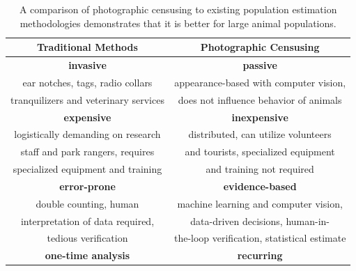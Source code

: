 \begin{table}[!t]
    \caption{A comparison of photographic censusing to existing population estimation methodologies demonstrates that it is better for large animal populations.}
    \label{table:comparison}
    \begin{center}
        \begin{tabular}{| c | c |}
            \hline
            \textbf{Traditional Methods}                          & \textbf{Photographic Censusing}                        \\
            \hline
            \textbf{invasive}                                     & \textbf{passive}                                       \\
            ear notches, tags, radio collars                      & appearance-based with computer vision,                 \\
            tranquilizers and veterinary services                 & does not influence behavior of animals                 \\
            \hline
            \textbf{expensive}                                    & \textbf{inexpensive}                                   \\
            logistically demanding on research                    & distributed, can utilize volunteers                    \\
            staff and park rangers, requires                      & and tourists, specialized equipment                    \\
            specialized equipment and training                    & and training not required                              \\
            \hline
            \textbf{error-prone}                                  & \textbf{evidence-based}                                \\
            double counting, human                                & machine learning and computer vision,                  \\
            interpretation of data required,                      & data-driven decisions, human-in-                       \\
            tedious verification                                  & the-loop verification, statistical estimate            \\
            \hline
            \textbf{one-time analysis}                            & \textbf{recurring}                                     \\

\end{tabular}
\end{center}
\end{table}
